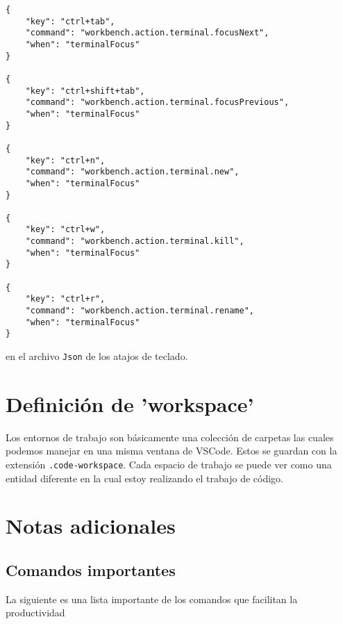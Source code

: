 \begin{verbatim}
{
    "key": "ctrl+tab",
    "command": "workbench.action.terminal.focusNext",
    "when": "terminalFocus"
}

{
    "key": "ctrl+shift+tab",
    "command": "workbench.action.terminal.focusPrevious",
    "when": "terminalFocus"
}

{
    "key": "ctrl+n",
    "command": "workbench.action.terminal.new",
    "when": "terminalFocus"
}

{
    "key": "ctrl+w",
    "command": "workbench.action.terminal.kill",
    "when": "terminalFocus"
}

{
    "key": "ctrl+r",
    "command": "workbench.action.terminal.rename",
    "when": "terminalFocus" 
}
\end{verbatim}

en el archivo \texttt{Json} de los atajos de teclado.

\section{Definición de 'workspace'}

Los entornos de trabajo son básicamente una colección de carpetas las cuales podemos manejar en una misma ventana de VSCode. Estos se guardan con la extensión \texttt{.code-workspace}. Cada espacio de trabajo se puede ver como una entidad diferente en la cual estoy realizando el trabajo de código.


\section{Notas adicionales}

\subsection{Comandos importantes}

La siguiente es una lista importante de los comandos que facilitan la productividad



